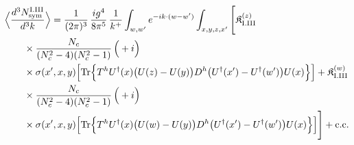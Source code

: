 \begin{align}\label{eq:S-I.III-3}
&\Big\langle\frac{d^{3}N^{\rm I.III}_{{\rm sym}}}{d^{3}k}\Big\rangle=\frac{1}{(2\pi)^{3}}\, \frac{ig^{4}}{8\pi^{5}}\, \frac{1}{k^{+}} \int_{w,w'}e^{-ik\cdot(w-w')} \int_{x,y,z,x'}\Bigg[ \mathfrak{K}^{(z)}_{\rm I.III}\notag\\
&\quad\quad \times \frac{N_{c}}{(N_{c}^{2}-4)(N_{c}^{2}-1)}\, \Big(+i\Big)\notag\\
&\quad\quad \times \sigma(x',x,y)\Big[{\rm Tr}\Big\{T^{h}U^{\dagger}(x)\big(U(z)-U(y)\big)D^{h}\big(U^{\dagger}(x')-U^{\dagger}(w')\big)U(x)\Big\}\Big] + \mathfrak{K}^{(w)}_{\rm I.III}\notag\\
&\quad\quad \times \frac{N_{c}}{(N_{c}^{2}-4)(N_{c}^{2}-1)}\, \Big(+i\Big)\notag\\
&\quad\quad \times \sigma(x',x,y)\Big[{\rm Tr}\Big\{T^{h}U^{\dagger}(x)\big(U(w)-U(y)\big)D^{h}\big(U^{\dagger}(x')-U^{\dagger}(w')\big)U(x)\Big\}\Big]\Bigg] +{\rm c.c.}
\end{align}

